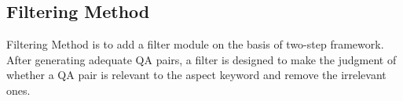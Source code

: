 \subsection{Filtering Method}
Filtering Method is to add a filter module on the basis of two-step framework.
After generating adequate QA pairs, 
a filter is designed to make the judgment of whether a QA pair is relevant to the aspect keyword
and remove the irrelevant ones.
%
%

